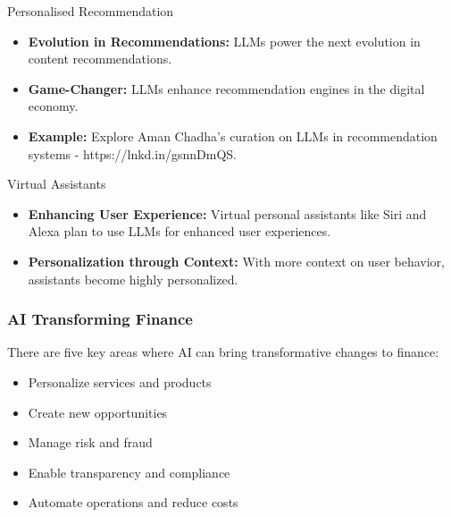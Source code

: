 \begin{frame}[fragile]{Personalised Recommendation}

\begin{itemize}
  \item \textbf{Evolution in Recommendations:} LLMs power the next evolution in content recommendations.
  
  \item \textbf{Game-Changer:} LLMs enhance recommendation engines in the digital economy.
  
  \item \textbf{Example:} Explore Aman Chadha's curation on LLMs in recommendation systems - https://lnkd.in/gsnnDmQS.
\end{itemize}

\end{frame}

\begin{frame}[fragile]{Virtual Assistants}

\begin{itemize}
  \item \textbf{Enhancing User Experience:} Virtual personal assistants like Siri and Alexa plan to use LLMs for enhanced user experiences.
  
  \item \textbf{Personalization through Context:} With more context on user behavior, assistants become highly personalized.
\end{itemize}

\end{frame}

\begin{frame}[fragile]\frametitle{AI Transforming Finance}
There are five key areas where AI can bring transformative changes to finance:
\begin{itemize}
    \item Personalize services and products
    \item Create new opportunities
    \item Manage risk and fraud
    \item Enable transparency and compliance
    \item Automate operations and reduce costs
\end{itemize}
\end{frame}

